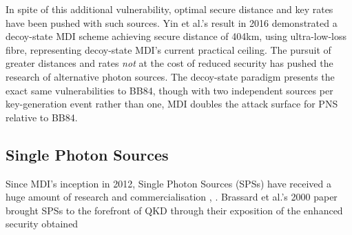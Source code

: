 \documentclass[9pt,technote]{IEEEtran}
\begin{document}
In spite of this additional vulnerability, optimal secure distance and key rates have been pushed with such sources. Yin et al.'s result in 2016 \cite{Yin_2016} demonstrated a decoy-state MDI scheme achieving secure distance of 404km, using ultra-low-loss fibre, representing decoy-state MDI's current practical ceiling. The pursuit of greater distances and rates \textit{not} at the cost of reduced security has pushed the research of alternative photon sources. The decoy-state paradigm presents the exact same vulnerabilities to BB84, though with two independent sources per key-generation event rather than one, MDI doubles the attack surface for PNS relative to BB84.

\subsection*{Single Photon Sources}
Since MDI's inception in 2012, Single Photon Sources (SPSs) have received a huge amount of research \cite{SPS_history} and commercialisation \cite{first_SPS}, \cite{QuandelaSPS}. Brassard et al.'s 2000 paper \cite{Brassard_2000} brought SPSs to the forefront of QKD through their exposition of the enhanced security obtained 
\end{document}
